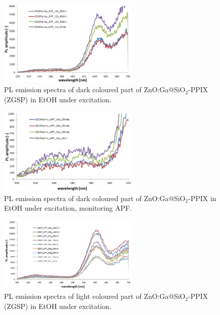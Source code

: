     \begin{figure}
        \centering
        \includegraphics[width=0.6\textwidth]{pictures/apf_zgsp_dark_new_holder.PNG}
        \caption{PL emission spectra of dark coloured part of ZnO:Ga@SiO$_{2}$-PPIX (ZGSP) in EtOH under  excitation.}
        \label{fig:apf_zgsp_dark_new_holder}
    \end{figure}
    
    \begin{figure}
        \centering
        \includegraphics[width=0.6\textwidth]{pictures/apf_zgsp_dark_vyrez_new_holder.PNG}
        \caption{PL emission spectra of dark coloured part of ZnO:Ga@SiO$_{2}$-PPIX in EtOH under  excitation, monitoring APF.}
        \label{fig:apf_zgsp_dark_vyrez_new_holder}
    \end{figure}
    
    \begin{figure}
        \centering
        \includegraphics[width=0.6\textwidth]{pictures/apf_zgsp_fair_new_holder.PNG}
        \caption{PL emission spectra of light coloured part of ZnO:Ga@SiO$_{2}$-PPIX (ZGSP) in EtOH under  excitation.}
        \label{fig:apf_zgsp_fair_new_holder}
    \end{figure}
    

